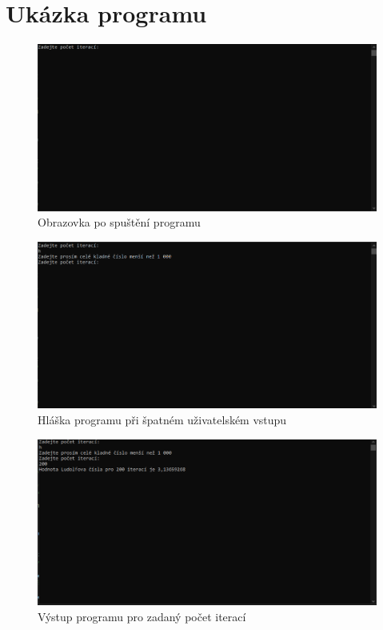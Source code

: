 \documentclass[11pt,a4paper]{report}
\begin{document}
	\section{Ukázka programu}
	\begin{figure}[h!]
			\centering
			\includegraphics[width=0.8\hsize]{img/spusteni.png}
			\caption{Obrazovka po spuštění programu}
		\end{figure}
		
	\begin{figure}[]
			\centering
			\includegraphics[width=1\hsize]{img/spusteni_chybny_vstup.png}
			\caption{Hláška programu při špatném uživatelském vstupu}
		\end{figure}
		
	\begin{figure}[]
			\centering
			\includegraphics[width=1\hsize]{img/spusteni_vysledek.png}
			\caption{Výstup programu pro zadaný počet iterací}
		\end{figure}
	
\end{document}
